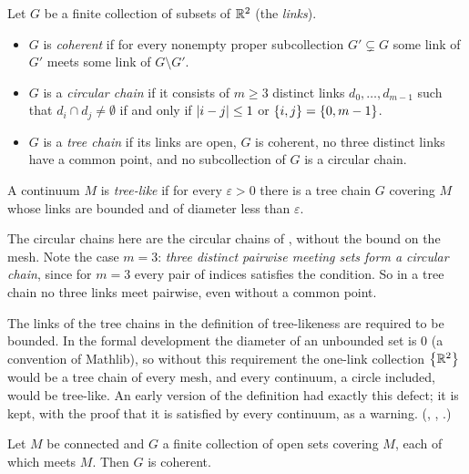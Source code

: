 \begin{definition}\label{def:treechain}
Let $G$ be a finite collection of subsets of $\mathbb{R}^2$ (the \emph{links}).
\begin{itemize}
\item $G$ is \emph{coherent} if for every nonempty proper subcollection $G'\subsetneq G$ some link of
$G'$ meets some link of $G\setminus G'$.
\item $G$ is a \emph{circular chain} if it consists of $m\ge3$ distinct links
$d_0,\dots,d_{m-1}$ such that $d_i\cap d_j\neq\emptyset$ if and only if $\left\lvert i-j\right\rvert\le1$ or
$\left\{ i,j \right\}=\left\{ 0,m-1 \right\}$.
\item $G$ is a \emph{tree chain} if its links are open, $G$ is coherent, no three distinct links
have a common point, and no subcollection of $G$ is a circular chain.
\end{itemize}
A continuum $M$ is \emph{tree-like} if for every $\varepsilon>0$ there is a tree chain $G$ covering
$M$ whose links are bounded and of diameter less than $\varepsilon$.
\end{definition}


The circular chains here are the circular chains of , without the bound on
the mesh. Note the case $m=3$: \emph{three distinct pairwise meeting sets form a circular chain}, since
for $m=3$ every pair of indices satisfies the condition. So in a tree chain no three links meet
pairwise, even without a common point.

\begin{remark}
The links of the tree chains in the definition of tree-likeness are required to be bounded. In the
formal development the diameter of an unbounded set is $0$ (a convention of Mathlib), so without
this requirement the one-link collection $\left\{ \mathbb{R}^2 \right\}$ would be a tree chain of every mesh, and every
continuum, a circle included, would be tree-like. An early version of the definition had exactly
this defect; it is kept, with the proof that it is satisfied by every continuum, as a warning.
(, ,
.)
\end{remark}

\begin{lemma}\label{lem:coherent-cover}
Let $M$ be connected and $G$ a finite collection of open sets covering $M$, each of which meets $M$.
Then $G$ is coherent.
\end{lemma}

